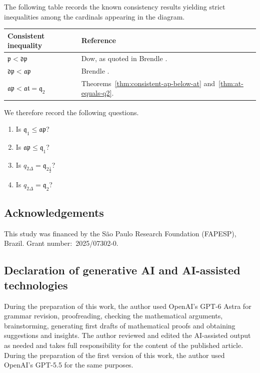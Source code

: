 The following table records the known consistency results yielding strict
inequalities among the cardinals appearing in the diagram.

\begin{center}
\begin{tabular}{@{}ll@{}}
\toprule
\textbf{Consistent inequality} & \textbf{Reference} \\
\midrule

$\mathfrak p<\mathfrak{dp}$ 
& Dow, as quoted in Brendle \cite{brendle1999dow}. \\

$\mathfrak{dp}<\mathfrak{ap}$ 
& Brendle \cite[Theorem~A]{brendle1999dow}. \\

$\mathfrak{ap}<\mathfrak{at}=\mathfrak q_2$
& Theorems~\ref{thm:consistent-ap-below-at} and~\ref{thm:at-equals-q2}. \\

\bottomrule
\end{tabular}
\end{center}


We therefore record the following questions.

\begin{prob}\label{prob:remaining-q-cardinals}\hfill
    \begin{enumerate}[label=(\arabic*)]
        \item Is $\mathfrak q_1\leq \mathfrak{ap}$?
        \item Is $\mathfrak{ap}\leq \mathfrak q_1$?
        \item Is $q_{2\Delta}=\mathfrak q_{2\frac{1}{2}}$?
        \item Is $q_{2\Delta}=\mathfrak q_2$?
    \end{enumerate}
\end{prob}
\subsection*{Acknowledgements}
This study was financed by the São Paulo Research Foundation (FAPESP), Brazil.
Grant number:~\mbox{2025/07302-0}.

\subsection*{Declaration of generative AI and AI-assisted technologies}
During the preparation of this work, the author used OpenAI's GPT-6 Astra for grammar revision, proofreading, checking the mathematical arguments, brainstorming, generating first drafts of mathematical proofs and obtaining suggestions and insights. The author reviewed and edited the AI-assisted output as needed and takes full responsibility for the content of the published article.
During the preparation of the first version of this work, the author used OpenAI's GPT-5.5 for the same purposes.
